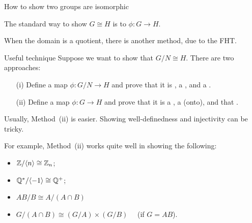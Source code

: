\documentclass[8pt]{beamer}
\newcommand{\Pause}{}      %
\begin{document}

\begin{frame}{How to show two groups are isomorphic}
  
  The standard way to show $G\cong H$ is to  $\phi\colon G\to H$.
  
  \medskip\Pause
  
  When the domain is a quotient, there is another method, due to the FHT. 
  
  \smallskip\Pause
  
  \begin{alertblock}{Useful technique}
    Suppose we want to show that $G/N\cong H$. There are two
    approaches: \Pause
    \begin{enumerate}
    \item[(i)] Define a map $\phi\colon G/N\to H$ and prove that it is
      , a , and a
      . \Pause
    \item[(ii)] Define a map $\phi\colon G\to H$ and prove that it is a
      , a  (onto), and
      that . 
    \end{enumerate}
  \end{alertblock}
  
  \smallskip\Pause
  
  Usually, Method~(ii) is easier. Showing well-definedness and
  injectivity can be tricky.
  
  \medskip\Pause
  
  For example, Method~(ii) works quite well in showing the
  following: \smallskip\Pause
  \begin{itemize}
  \item $\mathbb{Z}/\langle n\rangle\cong\mathbb{Z}_n$; \smallskip\Pause
  \item $\mathbb{Q}^*/\langle-1\rangle\cong\mathbb{Q}^+$; \smallskip\Pause
  \item $AB/B\cong A/(A\cap B)\quad$  \smallskip\Pause
  \item $G/(A\cap B)\cong (G/A)\times(G/B)\quad$ (if $G=AB$).
  \end{itemize}
  
\end{frame}

\end{document}

